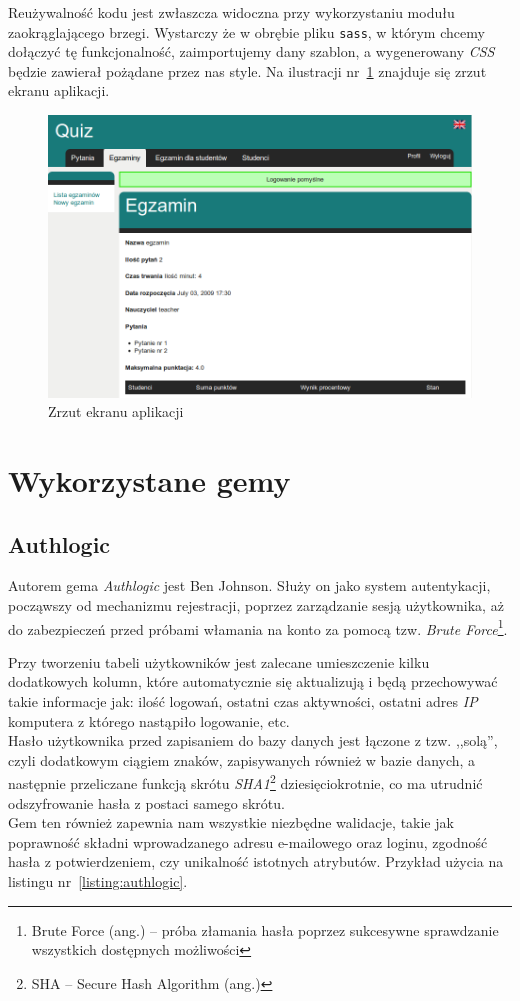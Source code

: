 \documentclass[12pt,twoside]{report}
\begin{document}
Reużywalność kodu jest zwłaszcza widoczna przy wykorzystaniu modułu zaokrąglającego
brzegi. Wystarczy że w obrębie pliku \texttt{sass}, w którym chcemy dołączyć tę
funkcjonalność, zaimportujemy dany szablon, a wygenerowany \emph{CSS} będzie zawierał
pożądane przez nas style. Na ilustracji nr~\ref{fig:layout} znajduje się zrzut ekranu
aplikacji.

\begin{figure}[ht]
  \begin{center}
    \includegraphics[width=1\linewidth]{images/layout.png}
  \end{center}
  \caption{Zrzut ekranu aplikacji}
  \label{fig:layout}
\end{figure}

\section{Wykorzystane gemy}
\subsection{Authlogic}\label{sec:authlogic}
Autorem gema \emph{Authlogic} jest Ben Johnson. Służy on jako system autentykacji,
począwszy od mechanizmu rejestracji, poprzez zarządzanie sesją użytkownika, aż do
zabezpieczeń przed próbami włamania na konto za pomocą tzw. \emph{Brute
Force}\footnote{Brute Force (ang.) -- próba złamania hasła poprzez sukcesywne sprawdzanie
wszystkich dostępnych możliwości}.


Przy tworzeniu tabeli użytkowników jest zalecane umieszczenie kilku dodatkowych kolumn,
które automatycznie się aktualizują i będą przechowywać takie informacje jak: ilość
logowań, ostatni czas aktywności, ostatni adres \emph{IP} komputera z którego nastąpiło
logowanie, etc.\\
Hasło użytkownika przed zapisaniem do bazy danych jest łączone z tzw. ,,solą'', czyli
dodatkowym ciągiem znaków, zapisywanych również w bazie danych, a następnie przeliczane
funkcją skrótu \emph{SHA1}\footnote{SHA -- Secure Hash Algorithm (ang.)}
dziesięciokrotnie, co ma utrudnić odszyfrowanie hasła z postaci samego skrótu.\\
Gem ten również zapewnia nam wszystkie niezbędne walidacje, takie jak poprawność składni
wprowadzanego adresu e-mailowego oraz loginu, zgodność hasła z potwierdzeniem, czy
unikalność istotnych atrybutów. Przykład użycia na listingu nr~\ref{listing:authlogic}.
\end{document}
